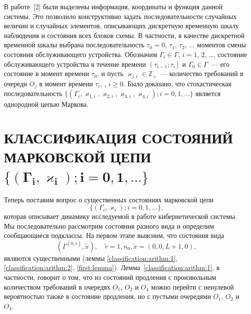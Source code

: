 \documentclass[12pt]{book}
\theoremstyle{plain}
\theoremstyle{remark}
\theoremstyle{plain}
\theoremstyle{definition}
\begin{document}
В работе~[2] были выделены информация, координаты и функция данной системы. Это
позволило конструктивно задать последовательности случайных величин и случайных
элементов, описывающих дискретную временную шкалу наблюдения и состояния всех
блоков схемы. В частности, в качестве дискретной временной шкалы выбрана
последовательность $\tau_0=0$, $\tau_1$, $\tau_2$, $\ldots$ моментов смены
состояния обслуживающего устройства. Обозначим $\Gamma_i\in\Gamma$, $i=1$, $2$,
\ldots{}, состояние обслуживающего устройства в течение времени
$\left(\tau_{i-1};\tau_i\right]$ и $\Gamma_0\in \Gamma$~--- его состояние в момент
времени $\tau_0$, и пусть $\varkappa_{j,i} \in \mathbb{Z}_+ $~--- количество
требований в очереди $O_j$ в момент времени $\tau_i$, , $i\geqslant 0$.  
Было доказано, что стохастическая последовательность $\{(\Gamma_i,
\varkappa_{1,i}, \varkappa_{2,i}, \varkappa_{3,i}, \varkappa_{4,i}); i=0, 1,
\ldots\}$ является однородной цепью Маркова.

\section{КЛАССИФИКАЦИЯ СОСТОЯНИЙ МАРКОВСКОЙ ЦЕПИ $\boldsymbol{\{(\Gamma_i,
\varkappa_{i}); i=0, 1,
\ldots\}}$ }\label{Classification}
Теперь поставим вопрос о существенных состояниях марковской цепи 
$$\{(\Gamma_i,
\varkappa_{i}); i=0, 1,
\ldots\},$$
которая описывает динамику исследуемой в работе кибернетической системы. Мы последовательно рассмотрим состояния разного вида и определим сообщающиеся подклассы. 
На первом этапе выясним,  что состояния вида 
$$(\Gamma^{(0,  \tilde{r})},  \tilde{x}),  \quad \tilde{r} = \overline{1,  n_0},  \tilde{x}=(0,  0,  L+1,  0), $$ 
являются существенными (леммы \ref{classification:arithm:1},  \ref{classification:arithm:2},  \ref{first:lemma}). Лемма~\ref{classification:arithm:1},  в частности,  говорит о том,  что из состояний продления с произвольным количеством требований в очередях $O_1$,  $O_2$ и $O_4$ можно перейти с ненулевой вероятностью также в состояние продления,  но с пустыми очередями $O_1$,  $O_2$ и $O_4$.
\end{document}
